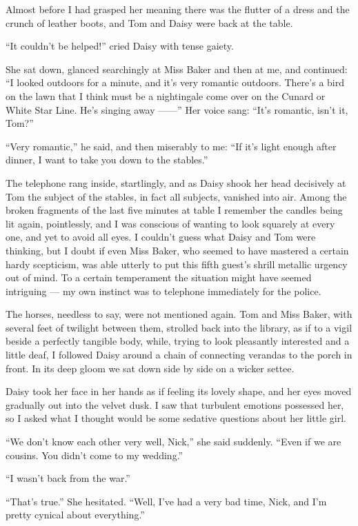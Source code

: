 \documentclass{znotebook}
\begin{document}
Almost before I had grasped her meaning there was the flutter of a dress and the crunch of leather boots, and Tom and Daisy were back at the table.

``It couldn't be helped!'' cried Daisy with tense gaiety.

She sat down, glanced searchingly at Miss Baker and then at me, and continued: ``I looked outdoors for a minute, and it's very romantic outdoors. There's a bird on the lawn that I think must be a nightingale come over on the Cunard or White Star Line. He's singing away ——'' Her voice sang: ``It's romantic, isn't it, Tom?''

``Very romantic,'' he said, and then miserably to me: ``If it's light enough after dinner, I want to take you down to the stables.''

The telephone rang inside, startlingly, and as Daisy shook her head decisively at Tom the subject of the stables, in fact all subjects, vanished into air. Among the broken fragments of the last five minutes at table I remember the candles being lit again, pointlessly, and I was conscious of wanting to look squarely at every one, and yet to avoid all eyes. I couldn't guess what Daisy and Tom were thinking, but I doubt if even Miss Baker, who seemed to have mastered a certain hardy scepticism, was able utterly to put this fifth guest's shrill metallic urgency out of mind. To a certain temperament the situation might have seemed intriguing — my own instinct was to telephone immediately for the police.

The horses, needless to say, were not mentioned again. Tom and Miss Baker, with several feet of twilight between them, strolled back into the library, as if to a vigil beside a perfectly tangible body, while, trying to look pleasantly interested and a little deaf, I followed Daisy around a chain of connecting verandas to the porch in front. In its deep gloom we sat down side by side on a wicker settee.

Daisy took her face in her hands as if feeling its lovely shape, and her eyes moved gradually out into the velvet dusk. I saw that turbulent emotions possessed her, so I asked what I thought would be some sedative questions about her little girl.

``We don't know each other very well, Nick,'' she said suddenly. ``Even if we are cousins. You didn't come to my wedding.''

``I wasn't back from the war.''

``That's true.'' She hesitated. ``Well, I've had a very bad time, Nick, and I'm pretty cynical about everything.''
\end{document}
